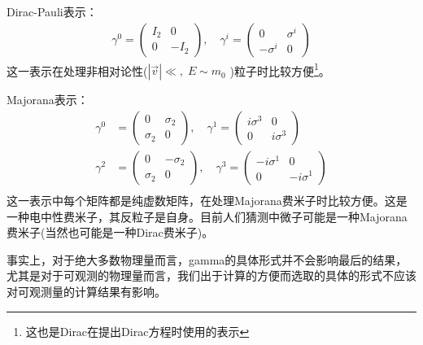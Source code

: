 Dirac-Pauli表示：
\begin{equation}
\label{chap4dirac}
    \begin{aligned}
    \gamma^{0}=\left(\begin{array}{cc}
        I_{2}&0 \\
       0&-I_{2} 
    \end{array}\right),\quad
    \gamma^{i}=\left(\begin{array}{cc}
       0  & \sigma^{i} \\
       -\sigma^{i}  & 0
    \end{array}\right)
    \end{aligned}
\end{equation}
这一表示在处理非相对论性($|\vec{v}|\ll,\;E\sim m_{0}$ )粒子时比较方便\footnote{这也是Dirac在提出Dirac方程时使用的表示}。

Majorana表示：
\begin{equation}
\label{chap4Majorana}
    \begin{aligned}
    \gamma^{0}&=\left(\begin{array}{cc}
        0&\sigma_{2} \\
       \sigma_{2}&0 
    \end{array}\right),\quad
    \gamma^{1}=\left(\begin{array}{cc}
        i\sigma^{3}&0 \\
         0&i\sigma^{3} 
    \end{array}\right)\\
    \gamma^{2}&=\left(\begin{array}{cc}
        0&-\sigma_{2} \\
       \sigma_{2}&0 
    \end{array}\right),\quad
    \gamma^{3}=\left(\begin{array}{cc}
        -i\sigma^{1}&0 \\
         0&-i\sigma^{1} 
    \end{array}\right)\\
    \end{aligned}
\end{equation}
这一表示中每个矩阵都是纯虚数矩阵，在处理Majorana费米子时比较方便。这是一种电中性费米子，其反粒子是自身。目前人们猜测中微子可能是一种Majorana费米子(当然也可能是一种Dirac费米子)。

事实上，对于绝大多数物理量而言，gamma的具体形式并不会影响最后的结果，尤其是对于可观测的物理量而言，我们出于计算的方便而选取的具体的形式不应该对可观测量的计算结果有影响。

